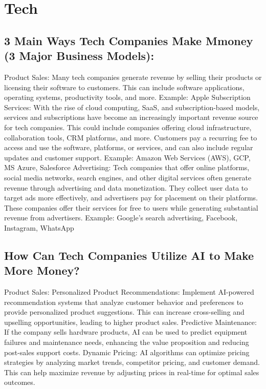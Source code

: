 \documentclass[
]{article}
\begin{document}
\hypertarget{tech}{%
\section{Tech}\label{tech}}

\hypertarget{main-ways-tech-companies-make-mmoney-3-major-business-models}{%
\subsection{3 Main Ways Tech Companies Make Mmoney (3 Major Business Models):}\label{main-ways-tech-companies-make-mmoney-3-major-business-models}}

Product Sales: Many tech companies generate revenue by selling their products or licensing their software to customers. This can include software applications, operating systems, productivity tools, and more.
Example: Apple
Subscription Services: With the rise of cloud computing, SaaS, and subscription-based models, services and subscriptions have become an increasingly important revenue source for tech companies. This could include companies offering cloud infrastructure, collaboration tools, CRM platforms, and more. Customers pay a recurring fee to access and use the software, platforms, or services, and can also include regular updates and customer support.
Example: Amazon Web Services (AWS), GCP, MS Azure, Salesforce
Advertising: Tech companies that offer online platforms, social media networks, search engines, and other digital services often generate revenue through advertising and data monetization. They collect user data to target ads more effectively, and advertisers pay for placement on their platforms. These companies offer their services for free to users while generating substantial revenue from advertisers.
Example: Google's search advertising, Facebook, Instagram, WhatsApp

\hypertarget{how-can-tech-companies-utilize-ai-to-make-more-money}{%
\subsection{How Can Tech Companies Utilize AI to Make More Money?}\label{how-can-tech-companies-utilize-ai-to-make-more-money}}

Product Sales:
Personalized Product Recommendations: Implement AI-powered recommendation systems that analyze customer behavior and preferences to provide personalized product suggestions. This can increase cross-selling and upselling opportunities, leading to higher product sales.
Predictive Maintenance: If the company sells hardware products, AI can be used to predict equipment failures and maintenance needs, enhancing the value proposition and reducing post-sales support costs.
Dynamic Pricing: AI algorithms can optimize pricing strategies by analyzing market trends, competitor pricing, and customer demand. This can help maximize revenue by adjusting prices in real-time for optimal sales outcomes.
\end{document}
